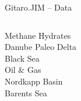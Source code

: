 \documentclass[xcolor=svgnames, aspectratio=169]{beamer}
\begin{document}
  \begin{frame}[t]%
    {Gitaro.JIM -- Data}
    \begin{columns}[t]
        \centering
        \alert{Methane Hydrates}\\
        Danube Paleo Delta\\
        Black Sea\\[1cm]
        \centering
        \alert{Oil \& Gas}\\
        Nordkapp Basin\\
        Barents Sea\\[1cm]

\end{columns}
\end{frame}
\end{document}

